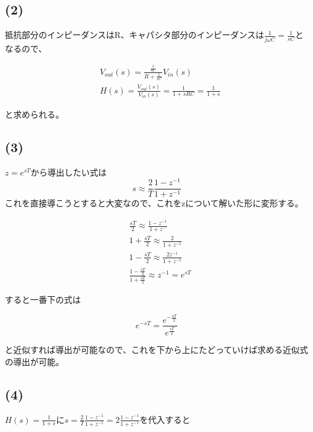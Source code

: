 \documentclass[a4paper,12pt,xelatex,ja=standard]{bxjsarticle}
\begin{document}
\subsection*{(2)}
抵抗部分のインピーダンスはR、キャパシタ部分のインピーダンスは$\frac{1}{j\omega C}=\frac{1}{sC}$となるので、

\begin{equation*}
  \begin{split}
    &V_{out}(s) = \frac{\frac{1}{sC}}{R + \frac{1}{sC}}V_{in}(s)\\
    &H(s) = \frac{V_{out}(s)}{V_{in}(s)} = \frac{1}{1 + sRC} = \frac{1}{1 + s}
  \end{split}
\end{equation*}

と求められる。

\subsection*{(3)}
$z=e^{sT}$から導出したい式は
\begin{equation*}
  s \approx \frac{2}{T} \frac{1 - z^{-1}}{1 + z^{-1}}
\end{equation*}
これを直接導こうとすると大変なので、これをzについて解いた形に変形する。

\begin{equation*}
  \begin{split}
    &\frac{sT}{2} \approx \frac{1 - z^{-1}}{1 + z^{-}} \\
    &1 + \frac{sT}{2} \approx \frac{2}{1 + z^{-1}} \\
    &1 - \frac{sT}{2} \approx \frac{2z^{-1}}{1 + z^{-1}}\\
    &\frac{1 - \frac{sT}{2}}{1 + \frac{sT}{2}} \approx z^{-1} = e^{sT}
  \end{split}
\end{equation*}

すると一番下の式は

\begin{equation*}
  e^{-sT} = \frac{e^{-\frac{sT}{2}}}{e^{\frac{sT}{2}}}
\end{equation*}

と近似すれば導出が可能なので、これを下から上にたどっていけば求める近似式の導出が可能。

\subsection*{(4)}
$H(s) = \frac{1}{1+s}$に$s = \frac{2}{T}\frac{1 - z^{-1}}{ 1 + z^{-1}} = 2 \frac{1 - z^{-1}}{1 + z^{-1}}$を代入すると
\end{document}
